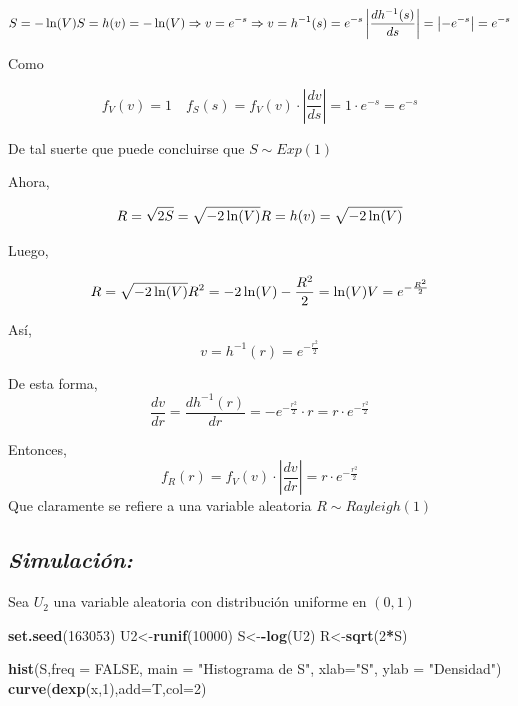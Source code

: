 \documentclass[]{article}
\newenvironment{Shaded}{\begin{snugshade}}{\end{snugshade}}
\newcommand{\KeywordTok}[1]{\textcolor[rgb]{0.13,0.29,0.53}{\textbf{#1}}}
\newcommand{\DataTypeTok}[1]{\textcolor[rgb]{0.13,0.29,0.53}{#1}}
\newcommand{\DecValTok}[1]{\textcolor[rgb]{0.00,0.00,0.81}{#1}}
\newcommand{\StringTok}[1]{\textcolor[rgb]{0.31,0.60,0.02}{#1}}
\newcommand{\OtherTok}[1]{\textcolor[rgb]{0.56,0.35,0.01}{#1}}
\newcommand{\OperatorTok}[1]{\textcolor[rgb]{0.81,0.36,0.00}{\textbf{#1}}}
\newcommand{\NormalTok}[1]{#1}
\begin{document}
\begin{equation}
S=-\ln(V)\\
S=h(v)=-\ln(V)\Rightarrow v=e^{-s} \Rightarrow v=h^{-1}(s)=e^{-s}\\
\left| \frac{dh^{-1}(s)}{ds}  \right|=\left| -e^{-s}  \right|=e^{-s}
\end{equation}

Como

\begin{equation}
f_V(v)=1 \quad f_S(s)=f_V(v)\cdot \left| \frac{dv}{ds}  \right|=1\cdot e^{-s}=e^{-s}
\end{equation}

De tal suerte que puede concluirse que \(S \sim Exp(1)\)

Ahora,

\begin{equation}
R=\sqrt{2S}=\sqrt{-2\ln(V)}\\
R=h(v)=\sqrt{-2\ln(V)}
\end{equation}

Luego,

\begin{equation}
R = \sqrt{-2\ln(V)}\\
R^2 = -2\ln(V)\\
-\frac{R^2}{2}=\ln(V)\\
V=e^{-\frac{R^2}{2}}
\end{equation}

Así, \[v=h^{-1}(r)=e^{-\frac{r^2}{2}}\]

De esta forma, \[
\frac{dv}{dr}=\frac{dh^{-1}(r)}{dr}=-e^{-\frac{r^2}{2}} \cdot r=r \cdot e^{-\frac{r^2}{2}}
\]

Entonces, \[
f_R(r)=f_V(v)\cdot \left| \frac{dv}{dr}  \right|=r \cdot e^{-\frac{r^2}{2}}
\] Que claramente se refiere a una variable aleatoria
\(R\sim Rayleigh(1)\)

\subsection{\texorpdfstring{\emph{Simulación:}}{Simulación:}}\label{simulacion-2}

Sea \(U_2\) una variable aleatoria con distribución uniforme en
\((0,1)\)

\begin{Shaded}
\begin{Highlighting}[]
\KeywordTok{set.seed}\NormalTok{(}\DecValTok{163053}\NormalTok{)}
\NormalTok{U2<-}\KeywordTok{runif}\NormalTok{(}\DecValTok{10000}\NormalTok{)}
\NormalTok{S<-}\OperatorTok{-}\KeywordTok{log}\NormalTok{(U2)}
\NormalTok{R<-}\KeywordTok{sqrt}\NormalTok{(}\DecValTok{2}\OperatorTok{*}\NormalTok{S)}

\KeywordTok{hist}\NormalTok{(S,}\DataTypeTok{freq =} \OtherTok{FALSE}\NormalTok{, }\DataTypeTok{main =} \StringTok{"Histograma de S"}\NormalTok{, }\DataTypeTok{xlab=}\StringTok{"S"}\NormalTok{, }\DataTypeTok{ylab =} \StringTok{"Densidad"}\NormalTok{)}
\KeywordTok{curve}\NormalTok{(}\KeywordTok{dexp}\NormalTok{(x,}\DecValTok{1}\NormalTok{),}\DataTypeTok{add=}\NormalTok{T,}\DataTypeTok{col=}\DecValTok{2}\NormalTok{)}
\end{Highlighting}
\end{Shaded}
\end{document}
